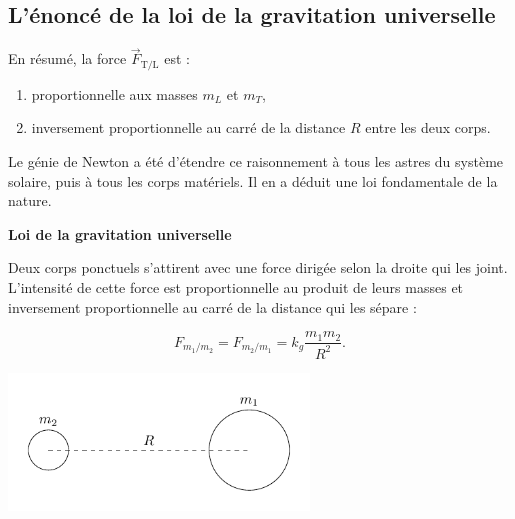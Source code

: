 \documentclass[
  letterpaper,
  DIV=11,
  numbers=noendperiod]{scrartcl}
\providecommand{\tightlist}{%
  \setlength{\itemsep}{0pt}\setlength{\parskip}{0pt}}\usepackage{longtable,booktabs,array}
\theoremstyle{definition}
\theoremstyle{definition}
\theoremstyle{definition}
\theoremstyle{remark}
\begin{document}
\subsection{L'énoncé de la loi de la gravitation
universelle}\label{luxe9noncuxe9-de-la-loi-de-la-gravitation-universelle}

En résumé, la force \(\overrightarrow{F}_{\text{T/L}}\) est :

\begin{enumerate}
\def\labelenumi{\arabic{enumi}.}
\tightlist
\item
  proportionnelle aux masses \(m_L\) et \(m_T\),
\item
  inversement proportionnelle au carré de la distance \(R\) entre les
  deux corps.
\end{enumerate}

Le génie de Newton a été d'étendre ce raisonnement à tous les astres du
système solaire, puis à tous les corps matériels. Il en a déduit une loi
fondamentale de la nature.

\begin{tcolorbox}[enhanced jigsaw, colframe=quarto-callout-note-color-frame, opacityback=0, breakable, toprule=.15mm, colback=white, leftrule=.75mm, arc=.35mm, bottomrule=.15mm, rightrule=.15mm, left=2mm]
\begin{minipage}[t]{5.5mm}
\textcolor{quarto-callout-note-color}{\faInfo}
\end{minipage}%
\begin{minipage}[t]{\textwidth - 5.5mm}

\vspace{-3mm}\textbf{Loi de la gravitation universelle}\vspace{3mm}

Deux corps ponctuels s'attirent avec une force dirigée selon la droite
qui les joint. L'intensité de cette force est proportionnelle au produit
de leurs masses et inversement proportionnelle au carré de la distance
qui les sépare :

\[
F_{m_1/m_2}=F_{m_2/m_1} = k_g \dfrac{m_1 m_2}{R^2}.
\]

\end{minipage}%
\end{tcolorbox}

\begin{center}
\includegraphics[width=0.6\textwidth,height=\textheight]{figures/grav/fig7.pdf}
\end{center}
\end{document}
